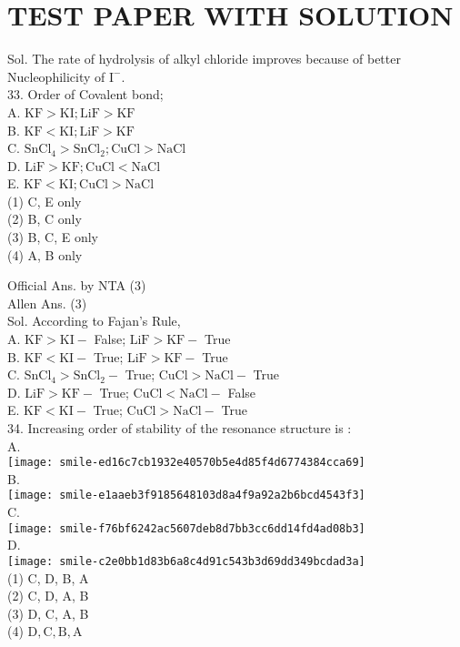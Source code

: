 \documentclass[10pt]{article}
\begin{document}
\section*{TEST PAPER WITH SOLUTION}
Sol. The rate of hydrolysis of alkyl chloride improves because of better Nucleophilicity of \(\mathrm{I}^{-}\).\\
33. Order of Covalent bond;\\
A. \(\mathrm{KF}>\mathrm{KI} ; \mathrm{LiF}>\mathrm{KF}\)\\
B. \(\mathrm{KF}<\mathrm{KI} ; \mathrm{LiF}>\mathrm{KF}\)\\
C. \(\mathrm{SnCl}_{4}>\mathrm{SnCl}_{2} ; \mathrm{CuCl}>\mathrm{NaCl}\)\\
D. \(\mathrm{LiF}>\mathrm{KF} ; \mathrm{CuCl}<\mathrm{NaCl}\)\\
E. \(\mathrm{KF}<\mathrm{KI} ; \mathrm{CuCl}>\mathrm{NaCl}\)\\
(1) C, E only\\
(2) B, C only\\
(3) B, C, E only\\
(4) A, B only

Official Ans. by NTA (3)\\
Allen Ans. (3)\\
Sol. According to Fajan's Rule,\\
A. \(\mathrm{KF}>\mathrm{KI}-\) False; \(\mathrm{LiF}>\mathrm{KF}-\) True\\
B. \(\mathrm{KF}<\mathrm{KI}-\) True; \(\mathrm{LiF}>\mathrm{KF}-\) True\\
C. \(\mathrm{SnCl}_{4}>\mathrm{SnCl}_{2}-\) True; \(\mathrm{CuCl}>\mathrm{NaCl}-\) True\\
D. \(\mathrm{LiF}>\mathrm{KF}-\) True; \(\mathrm{CuCl}<\mathrm{NaCl}-\) False\\
E. \(\mathrm{KF}<\mathrm{KI}-\) True; \(\mathrm{CuCl}>\mathrm{NaCl}-\) True\\
34. Increasing order of stability of the resonance structure is :\\
A.\\
\texttt{[image: smile-ed16c7cb1932e40570b5e4d85f4d6774384cca69]}\\
B.\\
\texttt{[image: smile-e1aaeb3f9185648103d8a4f9a92a2b6bcd4543f3]}\\
C.\\
\texttt{[image: smile-f76bf6242ac5607deb8d7bb3cc6dd14fd4ad08b3]}\\
D.\\
\texttt{[image: smile-c2e0bb1d83b6a8c4d91c543b3d69dd349bcdad3a]}\\
(1) C, D, B, A\\
(2) C, D, A, B\\
(3) D, C, A, B\\
(4) \(\mathrm{D}, \mathrm{C}, \mathrm{B}, \mathrm{A}\)
\end{document}
